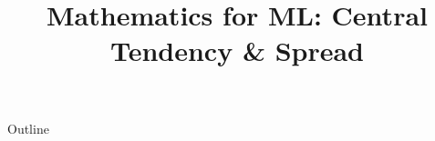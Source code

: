 \documentclass[xcolor=dvipsnames,compress,t,pdf,9pt]{beamer}
\title[\insertframenumber /\inserttotalframenumber]{Mathematics for ML: Central Tendency \& Spread}
\begin{document}
	\begin{frame}
	\titlepage
	\end{frame}

	\begin{frame}{Outline}
	    \tableofcontents
	\end{frame}

	
	
	
	
\end{document}
